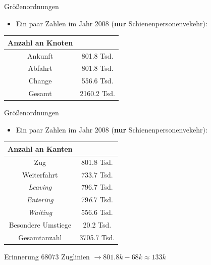 \begin{frame}{Größenordnungen}
	\begin{itemize}
		\item Ein paar Zahlen im Jahr 2008 (\textbf{nur} Schienenpersonenvekehr):
	\end{itemize}
\vspace{3em}
	\begin{center}
		\begin{tabular}{ c|c } 
			Anzahl an Knoten & \\
 			\hline
 			Ankunft & 801.8 Tsd. \\
 			Abfahrt & 801.8 Tsd. \\
 			Change & 556.6 Tsd. \\
 			\hline
 			Gesamt & 2160.2 Tsd.
		\end{tabular}
	\end{center}
\end{frame}


\begin{frame}{Größenordnungen}
	\begin{itemize}
		\item Ein paar Zahlen im Jahr 2008 (\textbf{nur} Schienenpersonenvekehr):
	\end{itemize}
	\vspace{1em}
	\begin{center}
		\begin{tabular}{ c|c } 
			Anzahl an Kanten & \\
 			\hline
 			Zug & 801.8 Tsd. \\
 			Weiterfahrt & 733.7 Tsd. \\
 			\textit{Leaving} & 796.7 Tsd. \\
 			\textit{Entering} & 79\textit{6}.7 Tsd. \\
 			\textit{Waiting} & 556.6 Tsd. \\
 			Besondere Umstiege & 20.2 Tsd. \\
 			\hline
 			Gesamtanzahl & 3705.7 Tsd.
		\end{tabular}
	\end{center}
	\begin{block}{Erinnerung}
		68073 Zuglinien $\rightarrow 801.8k - 68k \approx 133k$
	\end{block}
\end{frame}

